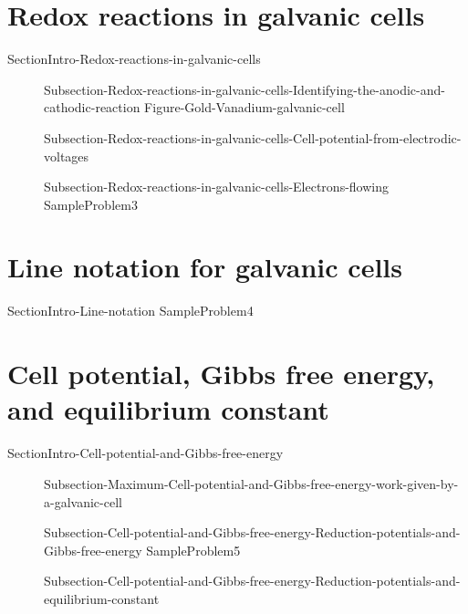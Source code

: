 \documentclass[main.tex]{subfiles}
\begin{document}
\section{Redox reactions in galvanic cells}{SectionIntro-Redox-reactions-in-galvanic-cells} 
\sloppy\begin{description}
\item[]{Subsection-Redox-reactions-in-galvanic-cells-Identifying-the-anodic-and-cathodic-reaction}
 {Figure-Gold-Vanadium-galvanic-cell}
  \item[]{Subsection-Redox-reactions-in-galvanic-cells-Cell-potential-from-electrodic-voltages}
   \item[]{Subsection-Redox-reactions-in-galvanic-cells-Electrons-flowing}
 {SampleProblem3}
\end{description}

\section{Line notation for galvanic cells}{SectionIntro-Line-notation}
  {SampleProblem4}



\section{Cell potential, Gibbs free energy, and equilibrium constant}{SectionIntro-Cell-potential-and-Gibbs-free-energy}
\sloppy\begin{description}
 \item[] {Subsection-Maximum-Cell-potential-and-Gibbs-free-energy-work-given-by-a-galvanic-cell}
  \item[] {Subsection-Cell-potential-and-Gibbs-free-energy-Reduction-potentials-and-Gibbs-free-energy}
 {SampleProblem5}
  \item[] {Subsection-Cell-potential-and-Gibbs-free-energy-Reduction-potentials-and-equilibrium-constant}
\end{description}
\end{document}
